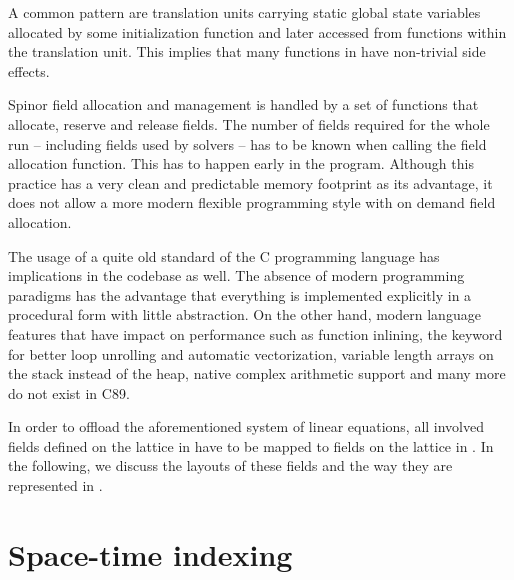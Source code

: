 A common pattern are translation units carrying static global state variables allocated by some initialization function and later accessed from functions within the translation unit. This implies that many functions in \openqxd have non-trivial side effects.%

Spinor field allocation and management is handled by a set of functions that allocate, reserve and release fields. The number of fields required for the whole run -- including fields used by solvers -- has to be known when calling the field allocation function. This has to happen early in the program. Although this practice has a very clean and predictable memory footprint as its advantage, it does not allow a more modern flexible programming style with on demand field allocation.

The usage of a quite old standard of the C programming language has implications in the codebase as well. The absence of modern programming paradigms has the advantage that everything is implemented explicitly in a procedural form with little abstraction. On the other hand, modern language features that have impact on performance such as function inlining, the  keyword for better loop unrolling and automatic vectorization, variable length arrays on the stack instead of the heap, native complex arithmetic support and many more do not exist in C89.

In order to offload the aforementioned system of linear equations, all involved fields defined on the lattice in \openqxd have to be mapped to fields on the lattice in \quda.
In the following, we discuss the layouts of these fields and the way they are represented in \openqxd.

\section{Space-time indexing}
\label{sec:openqxd:index}

